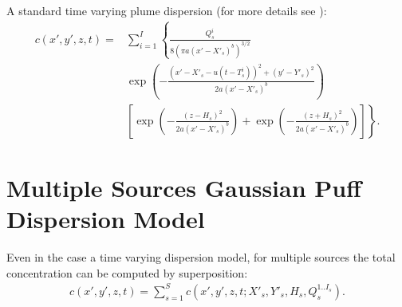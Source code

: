 \documentclass[a4paper,11pt]{report}
\begin{document}
A standard time varying plume dispersion (for more details see \cite{stockie2011}):
\begin{align}\label{eqn:singlesourcesgaussianpuffdispersion}
c(x',y',z,t) = & \sum_{i=1}^I \left\{ \frac{Q^i_s}{8(\pi a (x'-X'_s)^b)^{3/2}} \right. \nonumber \\
& \exp\left(-\frac{(x'-X'_s-u(t-T^i_s))^2+(y'-Y'_s)^2}{2 a (x'-X'_s)^b}\right) \nonumber \\
& \left. \left[\exp\left(-\frac{(z-H_s)^2}{2 a (x'-X'_s)^b}\right) + \exp\left(-\frac{(z+H_s)^2}{2 a (x'-X'_s)^b}\right)\right]\right\}.
\end{align}

\section{Multiple Sources Gaussian Puff Dispersion Model}

Even in the case a time varying dispersion model, for multiple sources the total concentration can be computed by superposition:
\begin{align}\label{eqn:multiplesourcesgaussianpuffdispersion}
c(x',y',z,t) = \sum_{s=1}^S c(x',y',z,t;X'_s,Y'_s,H_s,Q^{1..I_s}_s).
\end{align}
\end{document}
